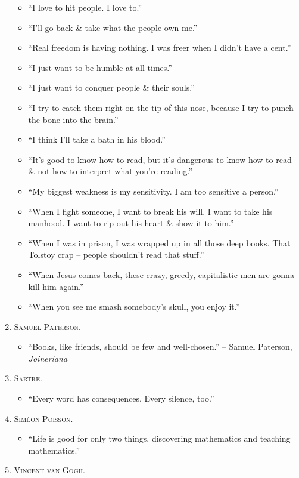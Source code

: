 \documentclass[oneside]{book}
\numberwithin{equation}{section}
\begin{document}
\begin{enumerate}
\begin{itemize}
		\item ``I love to hit people. I love to.''
		\item ``I'll go back \& take what the people own me.''
		\item ``Real freedom is having nothing. I was freer when I didn't have a cent.''
		\item ``I just want to be humble at all times.''
		\item ``I just want to conquer people \& their souls.''
		\item ``I try to catch them right on the tip of this nose, because I try to punch the bone into the brain.''
		\item ``I think I'll take a bath in his blood.''
		\item ``It's good to know how to read, but it's dangerous to know how to read \& not how to interpret what you're reading.''
		\item ``My biggest weakness is my sensitivity. I am too sensitive a person.''
		\item ``When I fight someone, I want to break his will. I want to take his manhood. I want to rip out his heart \& show it to him.''
		\item ``When I was in prison, I was wrapped up in all those deep books. That Tolstoy crap -- people shouldn't read that stuff.''
		\item ``When Jesus comes back, these crazy, greedy, capitalistic men are gonna kill him again.''
		\item ``When you see me smash somebody's skull, you enjoy it.''
	\end{itemize}
	\item \textsc{Samuel Paterson.}
	\begin{itemize}
		\item ``Books, like friends, should be few and well-chosen.'' -- Samuel Paterson, \textit{Joineriana}
	\end{itemize}
	\item \textsc{Sartre.}
	\begin{itemize}
		\item ``Every word has consequences. Every silence, too.''
	\end{itemize}
	\item \textsc{Sim\'eon Poisson.}
	\begin{itemize}
		\item ``Life is good for only two things, discovering mathematics and teaching mathematics.''
	\end{itemize}
	\item \textsc{Vincent van Gogh.}

\end{enumerate}
\end{document}
